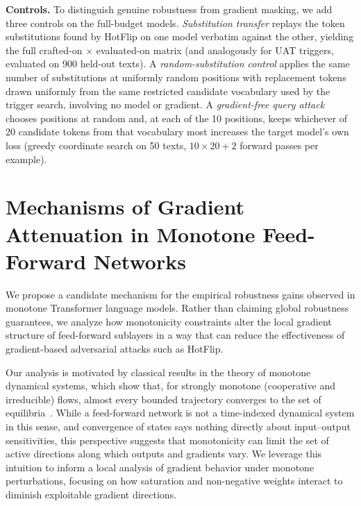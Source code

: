 \documentclass{article}
\theoremstyle{plain}
\theoremstyle{definition}
\theoremstyle{remark}
\begin{document}
\textbf{Controls.} To distinguish genuine robustness from gradient masking, we add three controls on the full-budget models. \emph{Substitution transfer} replays the token substitutions found by HotFlip on one model verbatim against the other, yielding the full crafted-on $\times$ evaluated-on matrix (and analogously for UAT triggers, evaluated on 900 held-out texts). A \emph{random-substitution control} applies the same number of substitutions at uniformly random positions with replacement tokens drawn uniformly from the same restricted candidate vocabulary used by the trigger search, involving no model or gradient. A \emph{gradient-free query attack} chooses positions at random and, at each of the 10 positions, keeps whichever of 20 candidate tokens from that vocabulary most increases the target model's own loss (greedy coordinate search on 50 texts, $10\times 20 + 2$ forward passes per example).

\section{Mechanisms of Gradient Attenuation in Monotone Feed-Forward Networks}
\label{sec:gradient-attenuation}
We propose a candidate mechanism for the empirical robustness gains observed in monotone Transformer language models.
Rather than claiming global robustness guarantees, we analyze how monotonicity constraints alter the local gradient structure of feed-forward sublayers in a way that can reduce the effectiveness of gradient-based adversarial attacks such as HotFlip.

Our analysis is motivated by classical results in the theory of monotone dynamical systems, which show that, for strongly monotone (cooperative and irreducible) flows, almost every bounded trajectory converges to the set of equilibria~\citep{hirsch1985systems}.
While a feed-forward network is not a time-indexed dynamical system in this sense, and convergence of states says nothing directly about input--output sensitivities, this perspective suggests that monotonicity can limit the set of active directions along which outputs and gradients vary. We leverage this intuition to inform a local analysis of gradient behavior under monotone perturbations, focusing on how saturation and non-negative weights interact to diminish exploitable gradient directions.
\end{document}
